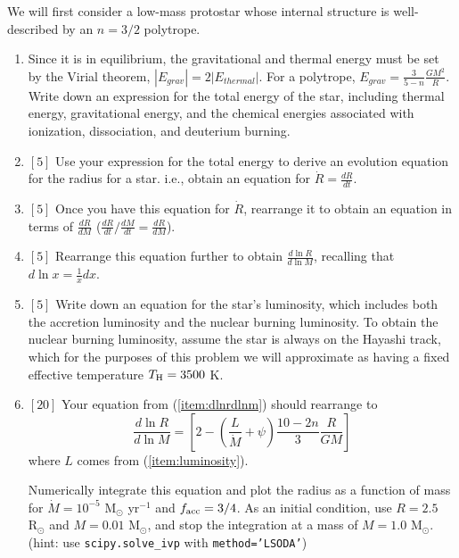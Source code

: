 \documentclass{article}
\newcommand{\msun}{\ensuremath{\mathrm{M}_\odot}\xspace}
\newcommand{\rsun}{\ensuremath{\mathrm{R}_\odot}\xspace}
\begin{document}
\begin{enumerate}
 We will first consider a low-mass protostar whose internal structure is
 well-described by an $n=3/2$ polytrope.


\begin{enumerate}
    \item 
 Since it is in equilibrium, the gravitational and thermal energy
 must be set by the Virial theorem, $|E_{grav}| =2 |E_{thermal}|$.
 For a polytrope, $E_{grav} = \frac{3}{5-n} \frac{G M^2}{R}$.
 Write down an expression for the total energy of the star,
 including thermal energy, gravitational energy, and the chemical energies
 associated with ionization, dissociation, and deuterium burning.
\item $[5]$ Use your expression for the total energy to derive an evolution equation
    for the radius for a star.  i.e., obtain an equation for $\dot{R}=\frac{dR}{dt}$.
\item $[5]$ Once you have this equation for $\dot{R}$, rearrange it to obtain an equation in terms
    of $\frac{dR}{dM}$ ($\frac{dR}{dt} / \frac{dM}{dt} = \frac{dR}{dM}$).
\item $[5]$
    Rearrange this equation further to obtain $\frac{d \ln R}{d \ln M}$,
    recalling that $d \ln x = \frac{1}{x}dx$.
    \label{item:dlnrdlnm}
\item $[5]$
    \label{item:luminosity}
    Write down an equation for the star's luminosity, which includes both the accretion 
    luminosity and the nuclear burning luminosity. 
    To obtain the nuclear burning luminosity,  assume the star is always on the Hayashi track,
    which for the purposes of this problem we will approximate as having a
    fixed effective temperature $T_{\rm H} = 3500$ K.
\item $[20]$
    Your equation from (\ref{item:dlnrdlnm}) should rearrange to
\begin{equation}
    \frac{d \ln R}{d \ln M} = \left[2 - \left(\frac{L}{\dot{M}}+\psi\right)\frac{10-2n}{3}\frac{R}{GM} \right]
\end{equation}
where $L$ comes from (\ref{item:luminosity}).

    Numerically integrate this equation and plot the radius as a function of
    mass for $\dot{M} = 10^{-5}$ $\msun$ yr$^{-1}$ and $f_{\rm acc}=3/4$. As an
    initial condition, use $R=2.5$ $\rsun$ and $M=0.01$ $\msun$, and stop the
    integration at a mass of $M=1.0$ $\msun$.
    (hint: use \texttt{scipy.solve\_ivp} with \texttt{method='LSODA'})


\end{enumerate}
\end{enumerate}
\end{document}
